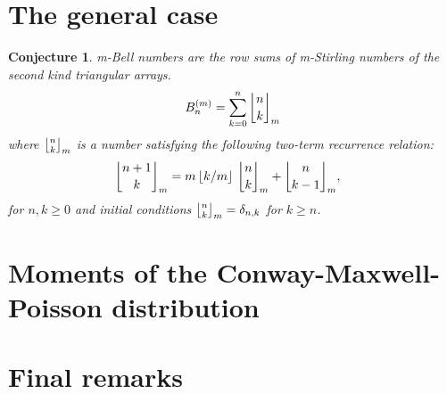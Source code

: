 \documentclass[a4paper]{amsart}
\newcommand{\mStirling}[0]{\genfrac{\lfloor}{\rfloor}{0pt}{}}
\newcommand{\floor}[1]{\left\lfloor #1 \right\rfloor}
\newtheorem{conjecture}[theorem]{Conjecture}
\begin{document}
\section{The general case}\label{sec-general-case}

\begin{conjecture}m-Bell numbers are the row sums of m-Stirling numbers of the second kind triangular arrays.
\[
B_{n}^{(m)} = \sum_{k=0}^n \mStirling{n}{k}_m
\]
where $\mStirling{n}{k}_m$ is a number satisfying the following two-term recurrence relation:
\[
\mStirling{n+1}{k}_m = m\floor{k/m} \, \genfrac{\lfloor}{\rfloor}{0pt}{}{n}{k}_m + \genfrac{\lfloor}{\rfloor}{0pt}{}{n}{k-1}_m, \,\,\,\,\,
\]
for $n, k \ge 0$ and initial conditions $\genfrac{\lfloor}{\rfloor}{0pt}{}{n}{k}_m = \delta_{n,k}$ for $k\ge n$.
\end{conjecture}

\section{Moments of the Conway-Maxwell-Poisson distribution}\label{sec-cmp}

\section{Final remarks}\label{sec-final-remarks}

\printbibliography
\end{document}
